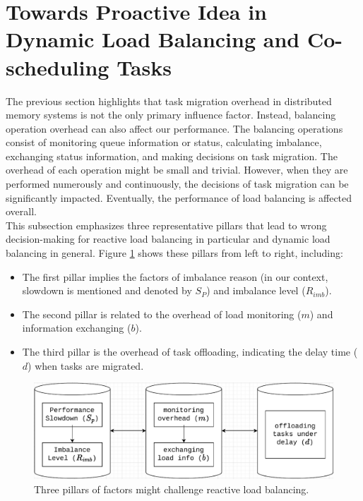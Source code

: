 \section{Towards Proactive Idea in Dynamic Load Balancing and Co-scheduling Tasks}
\label{sec:Idea-Proactive-LB}

The previous section highlights that task migration overhead in distributed memory systems is not the only primary influence factor. Instead, balancing operation overhead can also affect our performance. The balancing operations consist of monitoring queue information or status, calculating imbalance, exchanging status information, and making decisions on task migration. The overhead of each operation might be small and trivial. However, when they are performed numerously and continuously, the decisions of task migration can be significantly impacted. Eventually, the performance of load balancing is affected overall.\\

This subsection emphasizes three representative pillars that lead to wrong decision-making for reactive load balancing in particular and dynamic load balancing in general. Figure \ref{fig:three_pillars_reactlb} shows these pillars from left to right, including:
\begin{itemize}
	\item The first pillar implies the factors of imbalance reason (in our context, slowdown is mentioned and denoted by $S_{P}$) and imbalance level ($R_{imb}$).
	\item The second pillar is related to the overhead of load monitoring ($m$) and information exchanging ($b$).
	\item The third pillar is the overhead of task offloading, indicating the delay time ($d$) when tasks are migrated.
\end{itemize}

\begin{figure}[t]
  \centering
  \includegraphics[scale=0.55]{./pictures/perf_analysis_model/perf_three_pillars_of_react_lb.pdf}
	\caption{Three pillars of factors might challenge reactive load balancing.}
	\label{fig:three_pillars_reactlb}
\end{figure}

